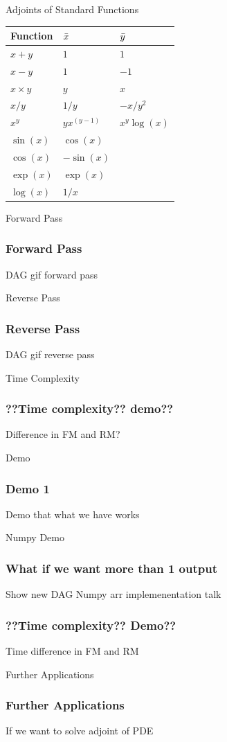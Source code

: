 \documentclass{beamer}
\begin{document}
\begin{frame}{Adjoints of Standard Functions}
    \begin{table}[h!]
    \centering
    \begin{tabular}{|lll|}
        \hline
        Function & $\Bar{x}$ & $\Bar{y}$ \\
        \hline
        $x+y$ & $1$ & $1$ \\
        $x-y$ & $1$ & $-1$ \\
        $x \times y$ & $y$ & $x$ \\
        $x / y$ & $1/y$ & $-x/y^2$ \\
        $x^y$ & $y{x}^{(y-1)}$ & ${x}^{y}\log(x)$ \\
        $\sin(x)$ & $\cos(x)$ &  \\
        $\cos(x)$ & $-\sin(x)$ &  \\
        $\exp(x)$ & $\exp(x)$ &  \\
        $\log(x)$ & $1/x$ &  \\
        \hline
    \end{tabular}
    \label{tab:Adjelementals}
    \end{table}
\end{frame}

\begin{frame}{Forward Pass}
\frametitle{Forward Pass}
DAG gif forward pass
\end{frame}

\begin{frame}{Reverse Pass}
\frametitle{Reverse Pass}
DAG gif reverse pass
\end{frame}

\begin{frame}{Time Complexity}
\frametitle{??Time complexity?? demo??}
Difference in FM and RM?
\end{frame}

\begin{frame}{Demo}
\frametitle{Demo 1}
Demo that what we have works
\end{frame}

\begin{frame}{Numpy Demo}
\frametitle{What if we want more than 1 output}
Show new DAG
Numpy arr implemenentation talk
\end{frame}

\begin{frame}
\frametitle{??Time complexity?? Demo??}
Time difference in FM and RM
\end{frame}

\begin{frame}{Further Applications}
\frametitle{Further Applications}
If we want to solve adjoint of PDE
\end{frame}
\end{document}
